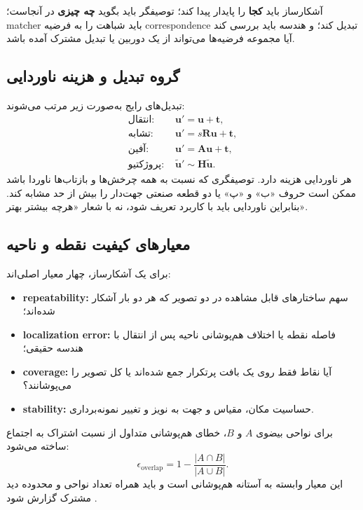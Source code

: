 \documentclass[12pt,openany,oneside]{book}
\newcommand{\vect}[1]{\bm{#1}}
\newcommand{\mat}[1]{\bm{#1}}
\begin{document}
\begin{principlebox}
آشکارساز باید \textbf{کجا} را پایدار پیدا کند؛ توصیفگر باید بگوید \textbf{چه چیزی} در آنجاست؛ matcher باید شباهت را به
فرضیه correspondence تبدیل کند؛ و هندسه باید بررسی کند آیا مجموعه فرضیه‌ها می‌تواند از یک دوربین یا تبدیل مشترک آمده باشد.
\end{principlebox}

\subsection{گروه تبدیل و هزینه ناوردایی}
تبدیل‌های رایج به‌صورت زیر مرتب می‌شوند:
\begin{align}
\text{انتقال: }&\vect u'=\vect u+\vect t,\\
\text{تشابه: }&\vect u'=s\mat R\vect u+\vect t,\\
\text{آفین: }&\vect u'=\mat A\vect u+\vect t,\\
\text{پروژکتیو: }&\widetilde{\vect u}'\sim \mat H\widetilde{\vect u}.
\end{align}
هر ناوردایی هزینه دارد. توصیفگری که نسبت به همه چرخش‌ها و بازتاب‌ها ناوردا باشد ممکن است حروف «ب» و «پ» یا دو قطعه
صنعتی جهت‌دار را بیش از حد مشابه کند. بنابراین ناوردایی باید با کاربرد تعریف شود، نه با شعار «هرچه بیشتر بهتر».

\subsection{معیارهای کیفیت نقطه و ناحیه}
برای یک آشکارساز، چهار معیار اصلی‌اند:
\begin{itemize}
\item \textbf{repeatability:} سهم ساختارهای قابل مشاهده در دو تصویر که هر دو بار آشکار شده‌اند؛
\item \textbf{localization error:} فاصله نقطه یا اختلاف هم‌پوشانی ناحیه پس از انتقال با هندسه حقیقی؛
\item \textbf{coverage:} آیا نقاط فقط روی یک بافت پرتکرار جمع شده‌اند یا کل تصویر را می‌پوشانند؟
\item \textbf{stability:} حساسیت مکان، مقیاس و جهت به نویز و تغییر نمونه‌برداری.
\end{itemize}
برای نواحی بیضوی $A$ و $B$، خطای هم‌پوشانی متداول از نسبت اشتراک به اجتماع ساخته می‌شود:
\begin{equation}
\epsilon_{\mathrm{overlap}}=1-\frac{|A\cap B|}{|A\cup B|}.
\end{equation}
این معیار وابسته به آستانه هم‌پوشانی است و باید همراه تعداد نواحی و محدوده دید مشترک گزارش شود \cite{mikolajczyk2005,mikolajczyk2006}.
\end{document}
